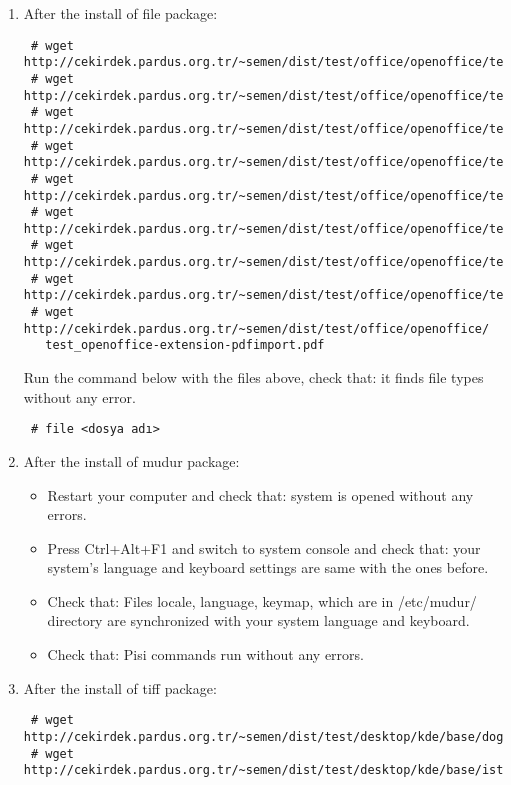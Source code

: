 \documentclass[a4paper,10pt]{article}
\begin{document}
\begin{enumerate}
\begin{itemize}
\end{itemize}


\item After the install of file package:

\begin{verbatim}
 # wget http://cekirdek.pardus.org.tr/~semen/dist/test/office/openoffice/test_oodraw.mng
 # wget http://cekirdek.pardus.org.tr/~semen/dist/test/office/openoffice/test_oodraw.odg
 # wget http://cekirdek.pardus.org.tr/~semen/dist/test/office/openoffice/test_oodraw.jpg
 # wget http://cekirdek.pardus.org.tr/~semen/dist/test/office/openoffice/test_oodraw.gif
 # wget http://cekirdek.pardus.org.tr/~semen/dist/test/office/openoffice/test_oodraw.png
 # wget http://cekirdek.pardus.org.tr/~semen/dist/test/office/openoffice/test_oodraw.tif
 # wget http://cekirdek.pardus.org.tr/~semen/dist/test/office/openoffice/test_oowriter.txt
 # wget http://cekirdek.pardus.org.tr/~semen/dist/test/office/openoffice/test_oodraw.ps
 # wget http://cekirdek.pardus.org.tr/~semen/dist/test/office/openoffice/
   test_openoffice-extension-pdfimport.pdf
\end{verbatim}

Run the command below with the files above, check that: it finds file types without any error.
\begin{verbatim}
 # file <dosya adı>
\end{verbatim}

\item After the install of mudur package:

\begin{itemize}
  \item Restart your computer and check that: system is opened without any errors.
 \item Press Ctrl+Alt+F1 and switch to system console and check that: your system's language and keyboard settings are same with the ones before.
  \item Check that: Files locale, language, keymap, which are in /etc/mudur/ directory  are synchronized with your system language and keyboard.
 \item Check that: Pisi commands run without any errors. 

\end{itemize}
\item After the install of tiff package:
\begin{verbatim}
 # wget http://cekirdek.pardus.org.tr/~semen/dist/test/desktop/kde/base/doga.tiff
 # wget http://cekirdek.pardus.org.tr/~semen/dist/test/desktop/kde/base/istanbul.tiff
\end{verbatim}


\end{enumerate}
\end{document}
